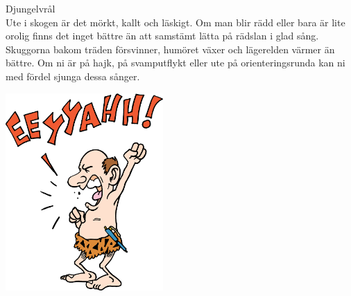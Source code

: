 \begin{flushleft}
{\Huge Djungelvrål\\}
{\Large
\vspace{1cm}
Ute i skogen är det mörkt, kallt och läskigt.
Om man blir rädd eller bara är lite orolig finns det inget bättre än att samstämt lätta på rädslan i glad sång.
Skuggorna bakom träden försvinner, humöret växer och lägerelden värmer än bättre.
Om ni är på hajk, på svamputflykt eller ute på orienteringsrunda kan ni med fördel sjunga dessa sånger.}
\end{flushleft}

\vspace{2cm}
\begin{center}
\includegraphics[width=6cm]{bilder/djungel.eps}
\end{center}
\newpage

\newpage
{}
\newpage
{}
\newpage
{}